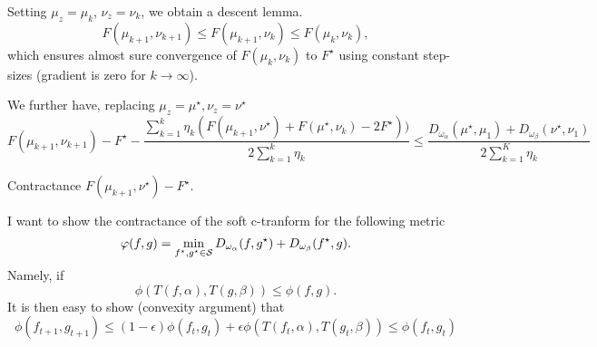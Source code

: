 \documentclass[a4paper, 10pt]{article}
\begin{document}
Setting $\mu_z = \mu_{k}$, $\nu_z = \nu_k$, we obtain a descent lemma.
\begin{equation}
    F(\mu_{k+1}, \nu_{k+1}) \leq F(\mu_{k+1}, \nu_{k}) \leq F(\mu_{k}, \nu_{k}),
\end{equation}
which ensures almost sure convergence of $F(\mu_k, \nu_k)$ to $F^\star$ using constant step-sizes (gradient is zero for $k \to \infty$).

We further have, replacing $\mu_z = \mu^\star, \nu_z = \nu^\star$
%
\begin{equation}
    F(\mu_{k+1}, \nu_{k+1}) - F^\star
    - \frac{
        \sum_{k=1}^k \eta_k (F(\mu_{k+1}, \nu^\star)
    +F(\mu^\star, \nu_k) - 2 F^\star))
    }
    {2 \sum_{k=1}^k \eta_k}
    \leq \frac{
    D_{\omega_\alpha}(\mu^\star, \mu_1)
    + D_{\omega_\beta}(\nu^\star, \nu_1)
    }{2 \sum_{k=1}^K \eta_k}
\end{equation}

Contractance $F(\mu_{k+1}, \nu^\star) - F^\star$.

I want to show the contractance of the soft c-tranform for the following metric
\begin{equation}
    \varphi(f, g) = \min_{f^\star, g^\star \in \mathcal{S}} 
    D_{\omega_\alpha}(f, g^\star)
    +
    D_{\omega_\beta}(f^\star, g).
\end{equation}
Namely, if 
\begin{equation}
    \phi(T(f,\alpha), T(g,\beta))
    \leq \phi(f, g).
\end{equation}
It is then easy to show (convexity argument) that
\begin{equation}
    \phi(f_{t+1}, g_{t+1}) \leq
    (1-\epsilon) 
    \phi(f_t, g_t)
    + \epsilon \phi(T(f_t,\alpha), T(g_t,\beta))
    \leq \phi(f_t, g_t)
\end{equation}
\printbibliography
\end{document}
